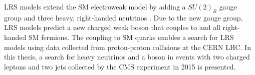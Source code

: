 LRS models extend the SM electroweak model by adding a $SU(2)_{R}$ gauge group and three heavy, right-handed 
neutrinos \nul.  Due to the new gauge group, LRS models predict a new charged weak boson \WR that couples to 
\nul and all right-handed SM fermions.  The \WR coupling to SM quarks enables a search for LRS models using 
data collected from proton-proton collisions at the CERN LHC.  In this thesis, a search for heavy neutrinos \nul 
and a \WR boson in events with two charged leptons and two jets collected by the CMS experiment in 2015 
is presented.

